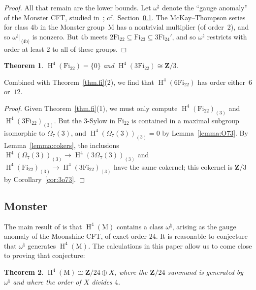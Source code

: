 \documentclass[pdftex]{sigma}
\numberwithin{equation}{section}
\newtheorem{Theorem}{Theorem}[section]
\newcommand\bZ{\mathbf Z}
\newcommand\rb{\mathrm b}
\newcommand\rM{\mathrm M}
\DeclareMathOperator\homology{H}
\renewcommand\H{\homology}
\newcommand\<\langle
\renewcommand\>\rangle
\newcommand\Fi{\mathrm{Fi}}
\begin{document}
\begin{proof}
 All that remain are the lower bounds. Let $\omega^\natural$ denote the ``gauge anomaly'' of the Monster CFT, studied in~\cite{JFmoonshine}; cf.\ Section~\ref{sec:monster}. The McKay--Thompson series for class $4\rb$ in the Monster group~$\rM$ has a nontrivial multiplier (of order~$2$), and so $\omega^\natural|_{\langle 4\rb\rangle}$ is nonzero. But $4\rb$ meets $2\Fi_{22} \subseteq \Fi_{23} \subseteq 3\Fi_{24}'$, and so $\omega^\natural$ restricts with order at least $2$ to all of these groups.
\end{proof}

\begin{Theorem} $\H^4(\Fi_{22}) = \{0\}$ and $\H^4(3\Fi_{22}) \cong \bZ/3$.
\end{Theorem}
Combined with Theorem~\ref{thm.fi}(2), we find that $\H^4(6\Fi_{22})$ has order either~$6$ or~$12$.
\begin{proof}
 Given Theorem~\ref{thm.fi}(1), we must only compute $\H^4(\Fi_{22})_{(3)}$ and $\H^4(3\Fi_{22})_{(3)}$. But the $3$-Sylow in $\Fi_{22}$ is contained in a maximal subgroup isomorphic to $\Omega_7(3)$, and $\H^4(\Omega_7(3))_{(3)} = 0$ by Lemma~\ref{lemma:O73}. By Lemma~\ref{lemma:cokers}, the inclusions $\H^4(\Omega_7(3))_{(3)} \to \H^4(3\Omega_7(3))_{(3)}$ and $\H^4(\Fi_{22})_{(3)} \to \H^4(3\Fi_{22})_{(3)}$ have the same cokernel; this cokernel is $\bZ/3$ by
 Corollary~\ref{cor:3o73}.
\end{proof}

\subsection{Monster} \label{sec:monster}

The main result of \cite{JFmoonshine} is that $\H^4(\rM)$ contains a class $\omega^\natural$, arising as the gauge anomaly of the Moonshine CFT, of exact order $24$.
It is reasonable to conjecture that $\omega^\natural$ generates $\H^4(\rM)$. The calculations in this paper allow us to come close to proving that conjecture:

\begin{Theorem}
 $\H^4(\rM) \cong \bZ/24 \oplus X$, where the $\bZ/24$ summand is generated by $\omega^\natural$ and where the order of $X$ divides $4$.
\end{Theorem}
\end{document}
